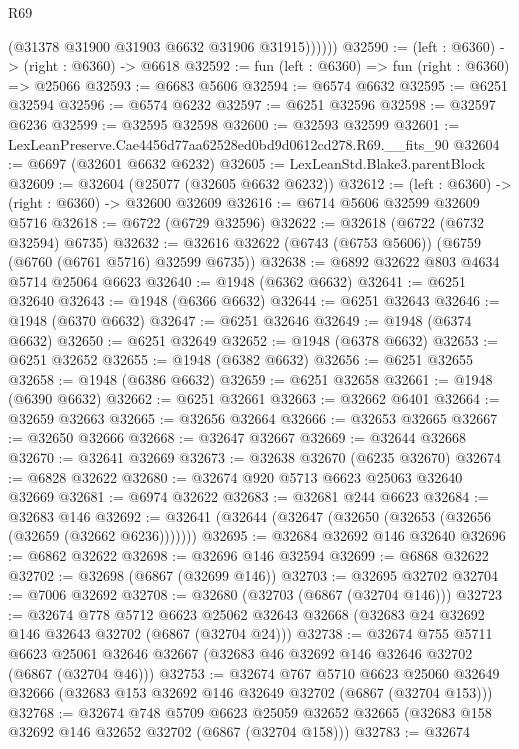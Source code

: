\begin{lexlean}{R69}
\begin{coremodule}
{              (@31378 @31900 @31903 @6632 @31906 @31915))))))
@32590 := (left : @6360) -> (right : @6360) -> @6618
@32592 := fun (left : @6360) => fun (right : @6360) => @25066
@32593 := @6683 @5606
@32594 := @6574 @6632
@32595 := @6251 @32594
@32596 := @6574 @6232
@32597 := @6251 @32596
@32598 := @32597 @6236
@32599 := @32595 @32598
@32600 := @32593 @32599
@32601 := LexLeanPreserve.Cae4456d77aa62528ed0bd9d0612cd278.R69.__fits_90
@32604 := @6697 (@32601 @6632 @6232)
@32605 := LexLeanStd.Blake3.parentBlock
@32609 := @32604 (@25077 (@32605 @6632 @6232))
@32612 := (left : @6360) -> (right : @6360) -> @32600 @32609
@32616 := @6714 @5606 @32599 @32609 @5716
@32618 := @6722 (@6729 @32596)
@32622 := @32618 (@6722 (@6732 @32594) @6735)
@32632 := @32616 @32622 (@6743 (@6753 @5606)) (@6759 (@6760 (@6761 @5716) @32599 @6735))
@32638 := @6892 @32622 @803 @4634 @5714 @25064 @6623
@32640 := @1948 (@6362 @6632)
@32641 := @6251 @32640
@32643 := @1948 (@6366 @6632)
@32644 := @6251 @32643
@32646 := @1948 (@6370 @6632)
@32647 := @6251 @32646
@32649 := @1948 (@6374 @6632)
@32650 := @6251 @32649
@32652 := @1948 (@6378 @6632)
@32653 := @6251 @32652
@32655 := @1948 (@6382 @6632)
@32656 := @6251 @32655
@32658 := @1948 (@6386 @6632)
@32659 := @6251 @32658
@32661 := @1948 (@6390 @6632)
@32662 := @6251 @32661
@32663 := @32662 @6401
@32664 := @32659 @32663
@32665 := @32656 @32664
@32666 := @32653 @32665
@32667 := @32650 @32666
@32668 := @32647 @32667
@32669 := @32644 @32668
@32670 := @32641 @32669
@32673 := @32638 @32670 (@6235 @32670)
@32674 := @6828 @32622
@32680 := @32674 @920 @5713 @6623 @25063 @32640 @32669
@32681 := @6974 @32622
@32683 := @32681 @244 @6623
@32684 := @32683 @146
@32692 := @32641 (@32644 (@32647 (@32650 (@32653 (@32656 (@32659 (@32662 @6236)))))))
@32695 := @32684 @32692 @146 @32640
@32696 := @6862 @32622
@32698 := @32696 @146 @32594
@32699 := @6868 @32622
@32702 := @32698 (@6867 (@32699 @146))
@32703 := @32695 @32702
@32704 := @7006 @32692
@32708 := @32680 (@32703 (@6867 (@32704 @146)))
@32723 := @32674
    @778
    @5712
    @6623
    @25062
    @32643
    @32668
    (@32683 @24 @32692 @146 @32643 @32702 (@6867 (@32704 @24)))
@32738 := @32674
    @755
    @5711
    @6623
    @25061
    @32646
    @32667
    (@32683 @46 @32692 @146 @32646 @32702 (@6867 (@32704 @46)))
@32753 := @32674
    @767
    @5710
    @6623
    @25060
    @32649
    @32666
    (@32683 @153 @32692 @146 @32649 @32702 (@6867 (@32704 @153)))
@32768 := @32674
    @748
    @5709
    @6623
    @25059
    @32652
    @32665
    (@32683 @158 @32692 @146 @32652 @32702 (@6867 (@32704 @158)))
@32783 := @32674
}
\end{coremodule}
\end{lexlean}
